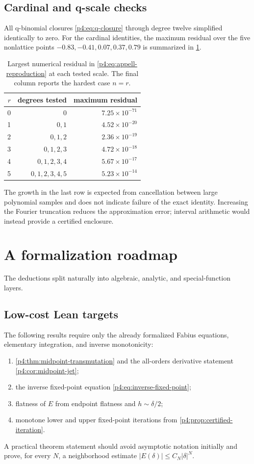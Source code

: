 \documentclass[11pt]{article}
\numberwithin{equation}{section}
\theoremstyle{definition}
\theoremstyle{remark}
\begin{document}
\subsection{Cardinal and q-scale checks}
All q-binomial closures \eqref{p4:eq:q-closure} through degree twelve simplified identically to zero.  For the cardinal identities, the maximum residual over the five nonlattice points
$-0.83,-0.41,0.07,0.37,0.79$ is summarized in \cref{p4:tab:reproduction-errors}.

\begin{table}[H]
\centering
\caption{Largest numerical residual in \eqref{p4:eq:appell-reproduction} at each tested scale.  The final column reports the hardest case $n=r$.}
\label{p4:tab:reproduction-errors}
\begin{tabular}{@{}rrr@{}}
\toprule
$r$ & degrees tested & maximum residual\\
\midrule
0 & $0$ & $7.25\times10^{-71}$\\
1 & $0,1$ & $4.52\times10^{-20}$\\
2 & $0,1,2$ & $2.36\times10^{-19}$\\
3 & $0,1,2,3$ & $4.72\times10^{-18}$\\
4 & $0,1,2,3,4$ & $5.67\times10^{-17}$\\
5 & $0,1,2,3,4,5$ & $5.23\times10^{-14}$\\
\bottomrule
\end{tabular}
\end{table}
The growth in the last row is expected from cancellation between large polynomial samples and does not indicate failure of the exact identity.  Increasing the Fourier truncation reduces the approximation error; interval arithmetic would instead provide a certified enclosure.

\section{A formalization roadmap}
\label{p4:sec:formalization}

The deductions split naturally into algebraic, analytic, and special-function layers.

\subsection{Low-cost Lean targets}
The following results require only the already formalized Fabius equations, elementary integration, and inverse monotonicity:
\begin{enumerate}
\item \cref{p4:thm:midpoint-transmutation} and the all-orders derivative statement \cref{p4:cor:midpoint-jet};
\item the inverse fixed-point equation \eqref{p4:eq:inverse-fixed-point};
\item flatness of $E$ from endpoint flatness and $h\sim\delta/2$;
\item monotone lower and upper fixed-point iterations from \cref{p4:prop:certified-iteration}.
\end{enumerate}
A practical theorem statement should avoid asymptotic notation initially and prove, for every $N$, a neighborhood estimate $|E(\delta)|\le C_N|\delta|^N$.
\end{document}
